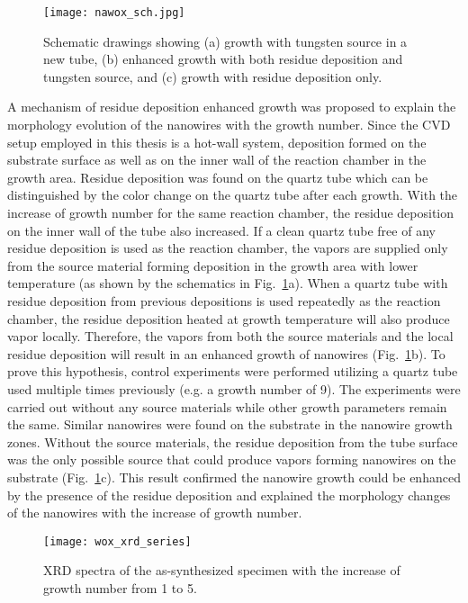 \begin{figure}[htb]
\centering
\texttt{[image: nawox\_sch.jpg]}
\caption[Schematic drawings of residual sodium tungsten oxides growth]{Schematic drawings showing (a) growth with tungsten source in a new tube, (b) enhanced growth with both residue deposition and tungsten source, and (c) growth with residue deposition only.}
\label{fig:nawoxsch}
\end{figure}

A mechanism of residue deposition enhanced growth was proposed to explain the morphology evolution of the nanowires with the growth number. Since the CVD setup employed in this thesis is a hot-wall system, deposition formed on the substrate surface as well as on the inner wall of the reaction chamber in the growth area. Residue deposition was found on the quartz tube which can be distinguished by the color change on the quartz tube after each growth. With the increase of growth number for the same reaction chamber, the residue deposition on the inner wall of the tube also increased. If a clean quartz tube free of any residue deposition is used as the reaction chamber, the vapors are supplied only from the source material forming deposition in the growth area with lower temperature (as shown by the schematics in Fig.~\ref{fig:nawoxsch}a). When a quartz tube with residue deposition from previous depositions is used repeatedly as the reaction chamber, the residue deposition heated at growth temperature will also produce vapor locally. Therefore, the vapors from both the source materials and the local residue deposition will result in an enhanced growth of nanowires (Fig.~\ref{fig:nawoxsch}b). To prove this hypothesis, control experiments were performed utilizing a quartz tube used multiple times previously (e.g. a growth number of 9). The experiments were carried out without any source materials while other growth parameters remain the same. Similar nanowires were found on the substrate in the nanowire growth zones. Without the source materials, the residue deposition from the tube surface was the only possible source that could produce vapors forming nanowires on the substrate (Fig.~\ref{fig:nawoxsch}c). This result confirmed the nanowire growth could be enhanced by the presence of the residue deposition and explained the morphology changes of the nanowires with the increase of growth number.
\begin{figure}[htb]
\centering
\texttt{[image: wox\_xrd\_series]}
\caption[XRD spectra of the as-synthesized specimen with the increase of growth number from 1 to 5]{XRD spectra of the as-synthesized specimen with the increase of growth number from 1 to 5.}
\label{fig:nawoxxrd}
\end{figure}
